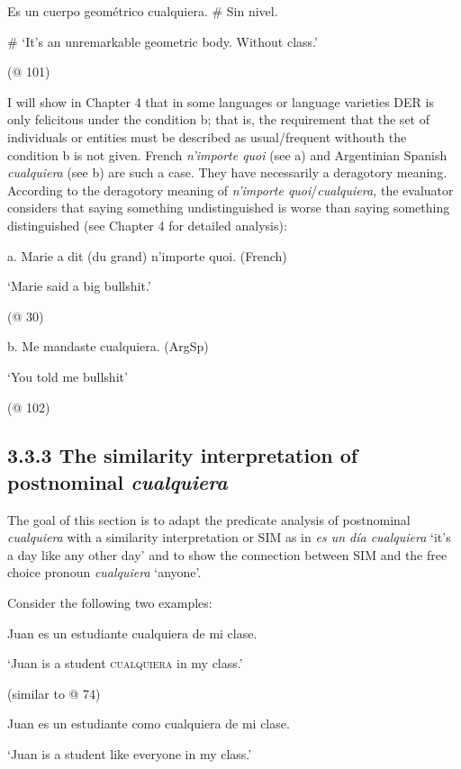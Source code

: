   Es un cuerpo geométrico cualquiera. \# Sin nivel.

  \# ‘It’s an unremarkable geometric body. Without class.’

  (@ 101)

I will show in Chapter 4 that in some languages or language varieties DER is only felicitous under the condition b; that is, the requirement that the set of individuals or entities must be described as usual/frequent withouth the condition b is not given. French \textit{n’importe quoi} (see a) and Argentinian Spanish \textit{cualquiera} (see b) are such a case. They have necessarily a deragotory meaning. According to the deragotory meaning of \textit{n’importe quoi}/\textit{cualquiera,} the evaluator considers that saying something undistinguished is worse than saying something distinguished (see Chapter 4 for detailed analysis):

\label{bkm:Ref72355051}  a.  Marie a dit (du grand) n’importe quoi.  (French)

    ‘Marie said a big bullshit.’  

      (@ 30)

  b.  Me mandaste cualquiera.  (ArgSp)

    ‘You told me bullshit’  

    (@ 102)

\subsection{\textbf{3.3.3} \textbf{The} \textbf{similarity} \textbf{interpretation} \textbf{of} \textbf{postnominal} \textbf{\textit{cualquiera}}}

The goal of this section is to adapt the predicate analysis of postnominal \textit{cualquiera} with a similarity interpretation or SIM as in \textit{es un día cualquiera} ‘it’s a day like any other day’ and to show the connection between SIM and the free choice pronoun \textit{cualquiera} ‘anyone’.   

  Consider the following two examples:

\label{bkm:Ref72353992}  Juan es un estudiante cualquiera de mi clase.

  ‘Juan is a student \textsc{cualquiera} in my class.’

  (similar to @ 74)

\label{bkm:Ref72354006}  Juan es un estudiante como cualquiera de mi clase.

  ‘Juan is a student like everyone in my class.’

